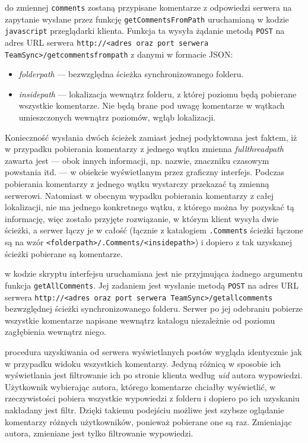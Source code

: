\documentclass[polish,a4paper,twoside]{ppfcmthesis}
\begin{document}
\begin{description}[noitemsep]
  \item[W widoku bieżącej lokalizacji] do zmiennej \texttt{comments} zostaną przypisane komentarze z odpowiedzi serwera na zapytanie wysłane przez funkcję \texttt{getCommentsFromPath} uruchamianą w kodzie \texttt{javascript} przeglądarki klienta. Funkcja ta wysyła żądanie metodą \texttt{POST} na adres URL serwera \texttt{http://<adres oraz port serwera TeamSync>\-/getcommentsfrompath} z danymi w formacie JSON:
  \begin{itemize}[noitemsep]
    \item \emph{folderpath} --- bezwzględna ścieżka synchronizowanego folderu.
    \item \emph{insidepath} --- lokalizacja wewnątrz folderu, z której poziomu będą pobierane wszystkie komentarze. Nie będą brane pod uwagę komentarze w wątkach umieszczonych wewnątrz poziomów, wgłąb lokalizacji.
  \end{itemize}
  Konieczność wysłania dwóch ścieżek zamiast jednej podyktowana jest faktem, iż w przypadku pobierania komentarzy z jednego wątku zmienna \emph{fullthreadpath} zawarta jest --- obok innych informacji, np. nazwie, znaczniku czasowym powstania itd. --- w obiekcie wyświetlanym przez graficzny interfejs. Podczas pobierania komentarzy z jednego wątku wystarczy przekazać tą zmienną serwerowi. Natomiast w obecnym wypadku pobierania komentarzy z całej lokalizacji, nie ma jednego konkretnego wątku, z którego można by pozyskać tą informację, więc zostało przyjęte rozwiązanie, w którym klient wysyła dwie ścieżki, a serwer łączy je w całość (łącznie z katalogiem \texttt{.Comments} ścieżki łączone są na wzór \texttt{<folderpath>/.Comments/<insidepath>}) i dopiero z tak uzyskanej ścieżki pobierane są komentarze.
  
  \item[W widoku wszystkich komentarzy] w kodzie skryptu interfejsu uruchamiana jest nie przyjmująca żadnego argumentu funkcja \texttt{get\-All\-Comments}. Jej zadaniem jest wysłanie metodą \texttt{POST} na adres URL serwera \texttt{http://<adres oraz port serwera TeamSync>/getallcomments} bezwzględnej ścieżki synchronizowanego folderu. Serwer po jej odebraniu pobierze wszystkie komentarze napisane wewnątrz katalogu niezależnie od poziomu zagłębienia wewnątrz niego.
  
  \item[W widoku wszystkich komentarzy użytkownika] procedura uzyskiwania od serwera wyświetlanych postów wygląda identycznie jak w przypadku widoku wszystkich komentarzy. Jedyną różnicą w sposobie ich wyświetlania jest filtrowanie ich po stronie klienta według \emph{uid} autora wypowiedzi. Użytkownik wybierając autora, którego komentarze chciałby wyświetlić, w rzeczywistości pobiera wszystkie wypowiedzi z folderu i dopiero po ich uzyskaniu nakładany jest filtr. Dzięki takiemu podejściu możliwe jest szybsze oglądanie komentarzy różnych użytkowników, ponieważ pobierane one są raz. Zmieniając autora, zmieniane jest tylko filtrowanie wypowiedzi.
\end{description}
\end{document}

